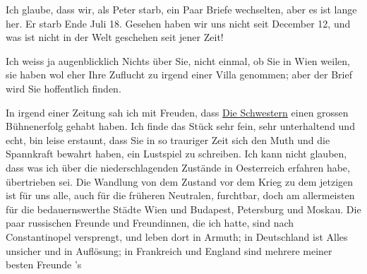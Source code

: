 \pstart
           Ich glaube, dass wir, als Peter starb, ein Paar
               Briefe wechselten, aber es ist lange her. Er starb Ende Juli 18. Gesehen
               haben wir uns nicht seit December 12, und was ist nicht in der Welt
               geschehen seit jener Zeit!\pend
           
\pstart
           Ich weiss ja augenblicklich Nichts über Sie, nicht einmal, ob Sie in Wien weilen, sie haben wol eher Ihre Zuflucht zu irgend einer
               Villa genommen; aber der Brief wird Sie hoffentlich finden.\pend
           
\pstart
           In irgend einer Zeitung sah ich mit Freuden, dass \uline{Die Schwestern} einen grossen Bühnenerfolg gehabt haben. Ich finde das Stück sehr fein, sehr
               unterhaltend und echt, bin leise erstaunt, {\pb}dass Sie in so trauriger Zeit sich
               den Muth und die Spannkraft bewahrt haben, ein Lustspiel zu schreiben. Ich kann nicht
               glauben, dass was ich über die niederschlagenden Zustände in Oesterreich erfahren habe, übertrieben sei. Die Wandlung von dem
               Zustand vor dem Krieg zu dem jetzigen ist für uns alle, auch für die früheren
               Neutralen, furchtbar, doch am allermeisten für die bedauernswerthe Städte Wien und Budapest, Petersburg und Moskau. Die paar russischen Freunde und Freundinnen, die ich hatte, sind nach Constantinopel versprengt, und leben dort in
               Armuth; in Deutschland ist Alles unsicher und in
               Auflösung; in Frankreich und England sind mehrere meiner besten Freunde \label{K_L02342-1v}\label{K_L02342-1}’s
